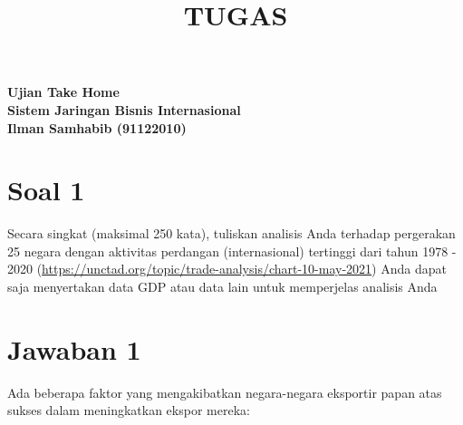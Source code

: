 \documentclass[12pt]{article}
\title{TUGAS }
\begin{document}

\begin{center}
  \textbf{Ujian Take Home}\\
  \textbf{Sistem Jaringan Bisnis Internasional}\\
  \textbf{Ilman Samhabib (91122010)}\\
\end{center}
\section*{Soal 1}
Secara singkat (maksimal 250 kata), tuliskan analisis Anda terhadap pergerakan 25 negara
dengan aktivitas perdangan (internasional) tertinggi dari tahun 1978 - 2020 
(\url{https://unctad.org/topic/trade-analysis/chart-10-may-2021})
Anda dapat saja menyertakan data GDP atau data lain untuk memperjelas analisis Anda

\section*{Jawaban 1}

Ada beberapa faktor yang mengakibatkan negara-negara eksportir papan atas sukses dalam meningkatkan ekspor mereka:
\end{document}
